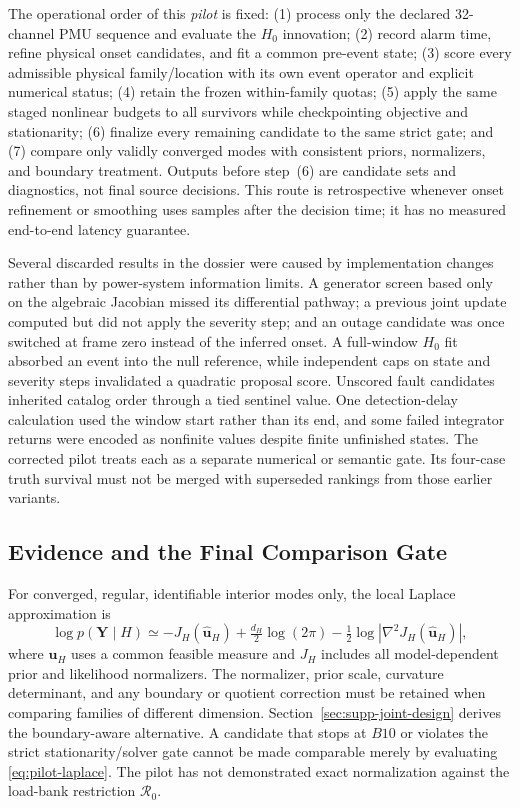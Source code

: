 The operational order of this \emph{pilot} is fixed: (1) process only the declared 32-channel PMU sequence and evaluate the $H_0$ innovation; (2) record alarm time, refine physical onset candidates, and fit a common pre-event state; (3) score every admissible physical family/location with its own event operator and explicit numerical status; (4) retain the frozen within-family quotas; (5) apply the same staged nonlinear budgets to all survivors while checkpointing objective and stationarity; (6) finalize every remaining candidate to the same strict gate; and (7) compare only validly converged modes with consistent priors, normalizers, and boundary treatment. Outputs before step~(6) are candidate sets and diagnostics, not final source decisions. This route is retrospective whenever onset refinement or smoothing uses samples after the decision time; it has no measured end-to-end latency guarantee.

Several discarded results in the dossier were caused by implementation changes rather than by power-system information limits. A generator screen based only on the algebraic Jacobian missed its differential pathway; a previous joint update computed but did not apply the severity step; and an outage candidate was once switched at frame zero instead of the inferred onset. A full-window $H_0$ fit absorbed an event into the null reference, while independent caps on state and severity steps invalidated a quadratic proposal score. Unscored fault candidates inherited catalog order through a tied sentinel value. One detection-delay calculation used the window start rather than its end, and some failed integrator returns were encoded as nonfinite values despite finite unfinished states. The corrected pilot treats each as a separate numerical or semantic gate. Its four-case truth survival must not be merged with superseded rankings from those earlier variants.

\subsection{Evidence and the Final Comparison Gate}

For converged, regular, identifiable interior modes only, the local Laplace approximation is
\begin{equation}
\log p(\bm Y\mid H)\simeq
-J_H(\widehat{\bm u}_H)
+\tfrac{d_H}{2}\log(2\pi)
-\tfrac12\log|\nabla^2J_H(\widehat{\bm u}_H)|,
\label{eq:pilot-laplace}
\end{equation}
where $\bm u_H$ uses a common feasible measure and $J_H$ includes all model-dependent prior and likelihood normalizers. The normalizer, prior scale, curvature determinant, and any boundary or quotient correction must be retained when comparing families of different dimension. Section~\ref{sec:supp-joint-design} derives the boundary-aware alternative. A candidate that stops at $B10$ or violates the strict stationarity/solver gate cannot be made comparable merely by evaluating \eqref{eq:pilot-laplace}. The pilot has not demonstrated exact normalization against the load-bank restriction $\mathcal R_0$.

